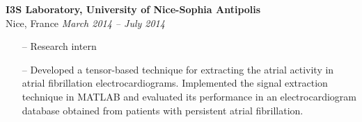 {\bf I3S Laboratory, University of Nice-Sophia Antipolis}\\
Nice, France \hfill  {\it March 2014 -- July 2014} \\
\begin{itemize}
	\item[--] Research intern
	\item[--] Developed a tensor-based technique for extracting the atrial activity in atrial fibrillation electrocardiograms. Implemented the signal extraction technique in MATLAB and evaluated its performance in an electrocardiogram database obtained from patients with persistent atrial fibrillation.
\end{itemize}